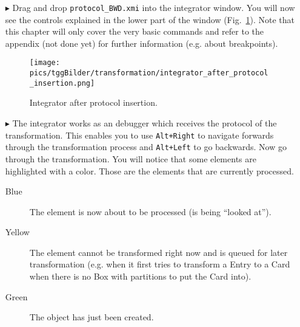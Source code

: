 \begin{enumerate}
\item[$\blacktriangleright$] Drag and drop \texttt{protocol\_BWD.xmi} into the integrator window. You will now see the controls explained in the lower part of the window (Fig.~\ref{fig:integrator_after_protocol}). Note that this chapter will only cover the very basic commands and refer to the appendix (not done yet) for further information (e.g. about breakpoints).

\begin{figure}[htbp]
\begin{center}
  \texttt{[image: pics/tggBilder/transformation/integrator\_after\_protocol\_insertion.png]}
  \caption{Integrator after protocol insertion.}
  \label{fig:integrator_after_protocol}
\end{center}
\end{figure}
\FloatBarrier

\item[$\blacktriangleright$] The integrator works as an debugger which receives the protocol of the transformation. This enables you to use \texttt{Alt+Right} to navigate forwards through the transformation process and \texttt{Alt+Left} to go backwards. Now go through the transformation.
You will notice that some elements are highlighted with a color. Those are the elements that are currently processed.

\begin{description}
  \item[Blue] The element is now about to be processed (is being ``looked at'').
  \item[Yellow] The element cannot be transformed right now and is queued for later transformation (e.g. when it first tries to transform a Entry to a Card when there is no Box with partitions to put the Card into).
  \item[Green] The object has just been created.
\end{description}



\end{enumerate}

